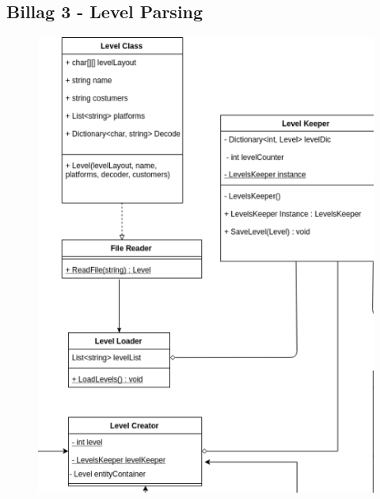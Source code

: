 \subsection{Billag 3 - Level Parsing}
\begin{figure}[H]
  \includegraphics[width=\linewidth]{Level_Parsing.png}
\end{figure}
